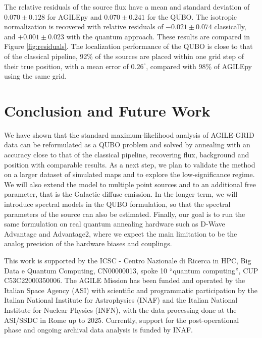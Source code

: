 \documentclass[11pt,twoside]{article}
\begin{document}

The relative residuals of the source flux have a mean and standard deviation of $0.070 \pm 0.128$ for AGILEpy and $0.070 \pm 0.241$ for the QUBO. The isotropic normalization is recovered with relative residuals of $-0.021 \pm 0.074$ classically, and $+0.001 \pm 0.023$ with the quantum approach. These results are compared in Figure \ref{fig:residuals}. The localization performance of the QUBO is close to that of the classical pipeline, 92\% of the sources are placed within one grid step of their true position, with a mean error of $0.26^\circ$, compared with 98\% of AGILEpy using the same grid.

\section{Conclusion and Future Work}
We have shown that the standard maximum-likelihood analysis of AGILE-GRID data can be reformulated as a QUBO problem and solved by annealing with an accuracy close to that of the classical pipeline, recovering flux, background and position with comparable results. As a next step, we plan to validate the method on a larger dataset of simulated maps and to explore the low-significance regime. We will also extend the model to multiple point sources and to an additional free parameter, that is the Galactic diffuse emission. In the longer term, we will introduce spectral models in the QUBO formulation, so that the spectral parameters of the source can also be estimated. Finally, our goal is to run the same formulation on real quantum annealing hardware such as D-Wave Advantage and Advantage2, where we expect the main limitation to be the analog precision of the hardware biases and couplings.





\acknowledgements
This work is supported by the ICSC - Centro Nazionale di Ricerca in HPC, Big Data e Quantum Computing, CN00000013, spoke 10 ``quantum computing'', CUP C53C22000350006. 
The AGILE Mission has been funded and operated by the Italian Space Agency (ASI) with scientific and programmatic participation by the Italian National Institute for Astrophysics (INAF) and the Italian National Institute for Nuclear Physics (INFN), with the data processing done at the ASI/SSDC in Rome up to 2025. Currently, support for the post-operational phase and ongoing archival data analysis is funded by INAF.




\end{document}
